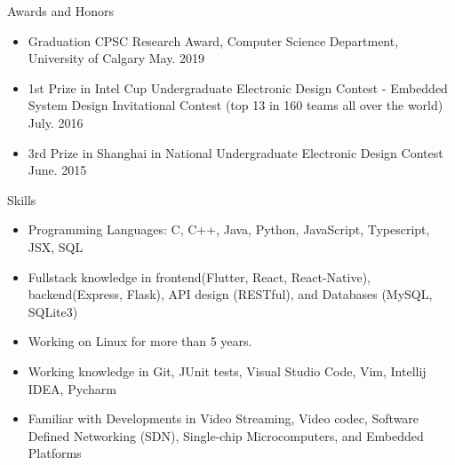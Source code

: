 \documentclass[10pt,oneside]{article}
\newenvironment{ressection}[1]{
	\vspace{4pt}
	{\fontfamily{phv}\selectfont\Large#1}
	\begin{itemize}
	\vspace{3pt}
}{
	\end{itemize}
}
\newcommand{\resitem}[1]{
	\vspace{-4pt}
	\item \begin{flushleft} #1 \end{flushleft}
}
\begin{document}
\begin{ressection}{Awards and Honors}
	\resitem{Graduation CPSC Research Award, Computer Science Department,
		University of Calgary \hfill May. 2019}
	\resitem{1st Prize in Intel Cup Undergraduate Electronic Design Contest - Embedded System Design Invitational Contest (top 13 in 160 teams all over the world) \hfill July. 2016}
	\resitem{3rd Prize in Shanghai in National Undergraduate Electronic Design Contest \hfill {June. 2015}}
\end{ressection}

\begin{ressection}{Skills}
	\resitem{Programming Languages: C, C++, Java, Python, JavaScript, Typescript, JSX, SQL}
	\resitem{Fullstack knowledge in frontend(Flutter, React, React-Native), backend(Express, Flask), API design (RESTful), and Databases (MySQL, SQLite3)}
	\resitem{Working on Linux for more than 5 years.}
	\resitem{Working knowledge in Git, JUnit tests, Visual Studio Code, Vim, Intellij IDEA, Pycharm}
	\resitem{Familiar with Developments in Video Streaming, Video codec, Software
		Defined Networking (SDN), Single-chip Microcomputers, and Embedded
		Platforms}
\end{ressection}
\end{document}
